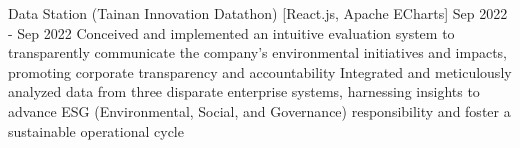 
\resumeProjEntry
{Data Station (Tainan Innovation Datathon)}
{[React.js, Apache ECharts]}
{Sep 2022 - Sep 2022}
{
    \resumeItemListStart
        \resumeItem
        {Conceived and implemented an intuitive evaluation system to transparently communicate the company's environmental initiatives and impacts, promoting corporate transparency and accountability}
        \resumeItem
        {Integrated and meticulously analyzed data from three disparate enterprise systems, harnessing insights to advance ESG (Environmental, Social, and Governance) responsibility and foster a sustainable operational cycle}
    \resumeItemListEnd
}

